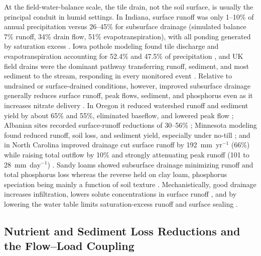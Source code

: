 \documentclass[11pt]{article}
\begin{document}
At the field-water-balance scale, the tile drain, not the soil surface, is
usually the principal conduit in humid settings. In Indiana, surface runoff was
only 1--10\% of annual precipitation versus 26--45\% for subsurface drainage
(simulated balance 7\% runoff, 34\% drain flow, 51\% evapotranspiration), with
all ponding generated by saturation excess \parencite{Saadat2020}. Iowa pothole
modeling found tile discharge and evapotranspiration accounting for 52.4\% and
47.5\% of precipitation \parencite{Amado2018,Martin2019}, and UK field drains
were the dominant pathway transferring runoff, sediment, and most sediment to
the stream, responding in every monitored event \parencite{Deasy2009}. Relative
to undrained or surface-drained conditions, however, improved subsurface
drainage generally reduces surface runoff, peak flows, sediment, and phosphorus
even as it increases nitrate delivery
\parencite{FAUSEY1995,SKAGGS1994,THOMAS1995,Gramlich2018}. In Oregon it reduced
watershed runoff and sediment yield by about 65\% and 55\%, eliminated baseflow,
and lowered peak flow \parencite{ISTOK1983}; Albanian sites recorded
surface-runoff reductions of 30--56\% \parencite{Grazhdani1996}; Minnesota
modeling found reduced runoff, soil loss, and sediment yield, especially under
no-till \parencite{Maalim2013}; and in North Carolina improved drainage cut
surface runoff by 192~mm~yr$^{-1}$ (66\%) while raising total outflow by 10\% and
strongly attenuating peak runoff (101 to 28~mm~day$^{-1}$)
\parencite{KONYHA1992}. Sandy loams showed subsurface drainage minimizing runoff
and total phosphorus loss whereas the reverse held on clay loam, phosphorus
speciation being mainly a function of soil texture \parencite{Eastman2010}.
Mechanistically, good drainage increases infiltration, lowers solute
concentrations in surface runoff \parencite{Tong2016,Tao2017}, and by lowering
the water table limits saturation-excess runoff and surface sealing
\parencite{Augeard2005}.

\subsection{Nutrient and Sediment Loss Reductions and the Flow--Load Coupling}
\end{document}
